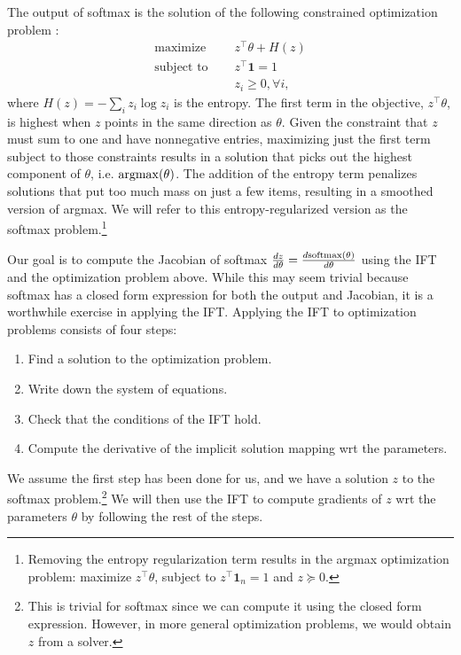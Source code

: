 \documentclass[11pt]{article}
\begin{document}
The output of softmax is the solution of the following constrained optimization problem
\citep{gao2018properties}:
\begin{equation}
\label{eqn:softmax-opt}
\begin{aligned}
\textrm{maximize } \quad & z^\top\theta + H(z)\\
\textrm{subject to } \quad & z^\top \mathbf{1} = 1\\
& z_i \geq 0, \forall i,
\end{aligned}
\end{equation}
where $H(z) = -\sum_i z_i \log z_i$ is the entropy.
The first term in the objective, $z^\top\theta$, is highest when $z$ points in the
same direction as $\theta$.
Given the constraint that $z$ must sum to one and have nonnegative entries,
maximizing just the first term subject to those constraints results in a solution
that picks out the highest component of $\theta$, i.e. $\operatorname*{argmax}(\theta)$.
The addition of the entropy term penalizes solutions that put too much
mass on just a few items, resulting in a smoothed version of argmax.
We will refer to this entropy-regularized version as the softmax problem.\footnote{
Removing the entropy regularization term results in the argmax optimization problem:
maximize $z^\top\theta$, subject to $z^\top\mathbf{1}_n=1$
and $z \succeq 0$.
}

Our goal is to compute the Jacobian of softmax
$\frac{dz}{d\theta} = \frac{d\mathrm{softmax}(\theta)}{d\theta}$
using the IFT and the optimization problem above.
While this may seem trivial because softmax has a closed form expression for
both the output and Jacobian, it is a worthwhile exercise in applying the IFT.
Applying the IFT to optimization problems consists of four steps:
\begin{enumerate}
\item Find a solution to the optimization problem.
\item Write down the system of equations.
\item Check that the conditions of the IFT hold.
\item Compute the derivative of the implicit solution mapping wrt the parameters.
\end{enumerate}

We assume the first step has been done for us,
and we have a solution $z$ to the softmax problem.\footnote{
This is trivial for softmax since we can compute it using the closed form
expression.
However, in more general optimization problems, we would obtain $z$ from a solver.}
We will then use the IFT to compute gradients of $z$ wrt the parameters $\theta$
by following the rest of the steps.
\end{document}
